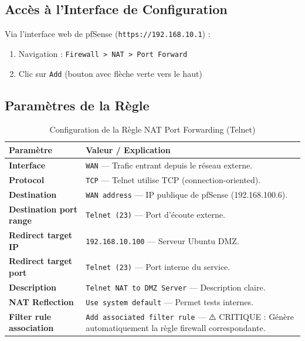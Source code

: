 \documentclass[12pt,a4paper,openany]{report}
\newcommand{\tableheadcolor}{\rowcolor{tableheadbg}}
\begin{document}
	\subsection{Accès à l'Interface de Configuration}
	Via l'interface web de pfSense (\texttt{https://192.168.10.1}) :
	\begin{enumerate}
		\item Navigation : \texttt{Firewall > NAT > Port Forward}
		\item Clic sur \texttt{Add} (bouton avec flèche verte vers le haut)
	\end{enumerate}
	
	\subsection{Paramètres de la Règle}
	\begin{table}[H]
		\centering
		\renewcommand{\arraystretch}{1.5}
		\setlength{\arrayrulewidth}{0.5pt}
		\begin{tabular}{>{\bfseries}p{4.5cm} p{9cm}}
			\arrayrulecolor{tableborder}
			\hline
			\tableheadcolor
			\textcolor{tableheadfg}{\textbf{Paramètre}} &
			\textcolor{tableheadfg}{\textbf{Valeur / Explication}} \\
			\hline
			\rowcolor{tablerowalt}
			Interface & \texttt{WAN} --- Trafic entrant depuis le réseau externe. \\
			
			Protocol & \texttt{TCP} --- Telnet utilise TCP (connection-oriented). \\
			
			\rowcolor{tablerowalt}
			Destination & \texttt{WAN address} --- IP publique de pfSense (192.168.100.6). \\
			
			Destination port range & \texttt{Telnet (23)} --- Port d'écoute externe. \\
			
			\rowcolor{tablerowalt}
			Redirect target IP & \texttt{192.168.10.100} --- Serveur Ubuntu DMZ. \\
			
			Redirect target port & \texttt{Telnet (23)} --- Port interne du service. \\
			
			\rowcolor{tablerowalt}
			Description & \texttt{Telnet NAT to DMZ Server} --- Description claire. \\
			
			NAT Reflection & \texttt{Use system default} --- Permet tests internes. \\
			
			\rowcolor{tablerowalt}
			Filter rule association & \texttt{Add associated filter rule} --- ⚠️ CRITIQUE : Génère automatiquement la règle firewall correspondante. \\
			\hline
		\end{tabular}
		\caption{Configuration de la Règle NAT Port Forwarding (Telnet)}
	\end{table}
	
\end{document}
